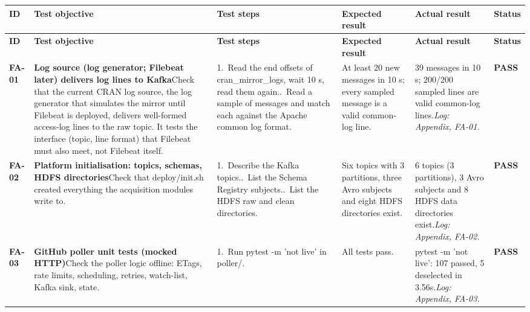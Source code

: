 {\footnotesize
\begin{longtable}{@{}L{1.1cm}L{5.8cm}L{5.4cm}L{3.9cm}L{5.5cm}L{1.3cm}@{}}
\toprule
\textbf{ID} & \textbf{Test objective} & \textbf{Test steps} & \textbf{Expected result} & \textbf{Actual result} & \textbf{Status} \\
\midrule
\endfirsthead
\toprule
\textbf{ID} & \textbf{Test objective} & \textbf{Test steps} & \textbf{Expected result} & \textbf{Actual result} & \textbf{Status} \\
\midrule
\endhead
\bottomrule
\endfoot
\textbf{FA-01} & \textbf{Log source (log generator; Filebeat later) delivers log lines to Kafka}\newline Check that the current CRAN log source, the log generator that simulates the mirror until Filebeat is deployed, delivers well-formed access-log lines to the raw topic. It tests the interface (topic, line format) that Filebeat must also meet, not Filebeat itself. & 1.~Read the end offsets of cran\_\allowbreak{}mirror\_\allowbreak{}logs, wait 10 s, read them again..~Read a sample of messages and match each against the Apache common log format. & At least 20 new messages in 10 s; every sampled message is a valid common-log line. & 39 messages in 10 s; 200/\allowbreak{}200 sampled lines are valid common-log lines.\newline \textit{Log: Appendix, FA-01.} & \textbf{\textcolor{green!45!black}{PASS}} \\
\midrule[0.3pt]
\textbf{FA-02} & \textbf{Platform initialisation: topics, schemas, HDFS directories}\newline Check that deploy/\allowbreak{}init.sh created everything the acquisition modules write to. & 1.~Describe the Kafka topics..~List the Schema Registry subjects..~List the HDFS raw and clean directories. & Six topics with 3 partitions, three Avro subjects and eight HDFS directories exist. & 6 topics (3 partitions), 3 Avro subjects and 8 HDFS data directories exist.\newline \textit{Log: Appendix, FA-02.} & \textbf{\textcolor{green!45!black}{PASS}} \\
\midrule[0.3pt]
\textbf{FA-03} & \textbf{GitHub poller unit tests (mocked HTTP)}\newline Check the poller logic offline: ETags, rate limits, scheduling, retries, watch-list, Kafka sink, state. & 1.~Run pytest -m 'not live' in poller/\allowbreak{}. & All tests pass. & pytest -m 'not live': 107 passed, 5 deselected in 3.56s.\newline \textit{Log: Appendix, FA-03.} & \textbf{\textcolor{green!45!black}{PASS}} \\

\end{longtable}}
